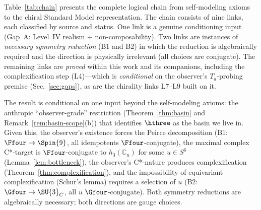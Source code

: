 Table~\ref{tab:chain} presents the complete logical chain from self-modeling
axioms to the chiral Standard Model representation. The chain consists of
nine links, each classified by source and status. One link is a genuine
conditioning input (Gap~A: Level~IV realism $+$ non-composability). Two
links are instances of \emph{necessary symmetry reduction} (B1 and
B2) in which the reduction is algebraically required and the direction is
physically irrelevant (all choices are conjugate). The remaining links
are \emph{proved} within this work and its companions, including the
complexification step (L4)---which is \emph{conditional} on the observer's $T_a$-probing premise (Sec.~\ref{sec:gaps}), as are the chirality links L7--L9 built on it.

The result is conditional on one input beyond the self-modeling
axioms: the anthropic ``observer-grade'' restriction
(Theorem~\ref{thm:basin} and Remark~\ref{rem:basin-scope}(b)) that
identifies $\hthree$ as the basin we live in.  Given this, the
observer's existence forces the Peirce decomposition (B1:
$\Ffour\to\Spin{9}$, all idempotents $\Ffour$-conjugate), the
maximal complex C*-target is $\Ffour$-conjugate to
$h_3(\mathbb{C}_u)$ for some $u\in S^6$
(Lemma~\ref{lem:bottleneck}), the observer's C*-nature produces
complexification (Theorem~\ref{thm:complexification}), and the
impossibility of equivariant complexification (Schur's lemma)
requires a selection of $u$ (B2: $\Gfour\to\SU{3}_C$, all $u$
$\Gfour$-conjugate).  Both symmetry reductions are algebraically
necessary; both directions are gauge choices.

